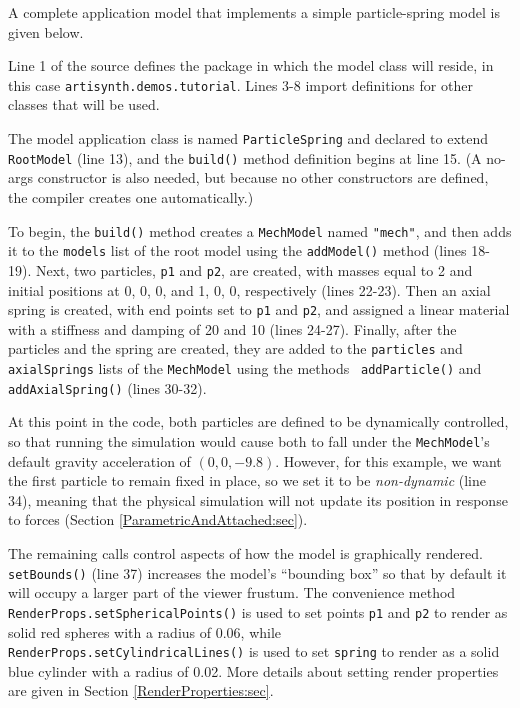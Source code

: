 A complete application model that implements a simple particle-spring
model is given below. 
\lstset{numbers=left}

\lstset{numbers=none}

Line 1 of the source defines the package in which the model class will
reside, in this case {\tt artisynth.demos.tutorial}. Lines 3-8 import
definitions for other classes that will be used.

The model application class is named {\tt ParticleSpring} and declared
to extend {\tt RootModel} (line 13), and the {\tt build()} method
definition begins at line 15. (A no-args constructor is also needed,
but because no other constructors are defined, the compiler creates
one automatically.)

To begin, the {\tt build()} method creates a {\tt MechModel} named
{\tt "mech"}, and then adds it to the {\tt models} list of the root model
using the {\tt addModel()} method (lines 18-19). Next, two particles,
{\tt p1} and {\tt p2}, are created, with masses equal to 2 and initial
positions at 0, 0, 0, and 1, 0, 0, respectively (lines 22-23). Then an
axial spring is created, with end points set to {\tt p1} and {\tt p2},
and assigned a linear material with a stiffness and damping of 20 and
10 (lines 24-27). Finally, after the particles and the spring are
created, they are added to the {\tt particles} and {\tt axialSprings}
lists of the {\tt MechModel} using the methods {\tt
addParticle()} and {\tt addAxialSpring()} (lines 30-32).

At this point in the code, both particles are defined to be
dynamically controlled, so that running the simulation would cause
both to fall under the {\tt MechModel}'s default gravity acceleration
of $(0, 0, -9.8)$. However, for this example, we want the first
particle to remain fixed in place, so we set it to be {\it
non-dynamic} (line 34), meaning that the physical simulation will not
update its position in response to forces (Section
\ref{ParametricAndAttached:sec}).

The remaining calls control aspects of how the model is graphically
rendered.  {\tt setBounds()} (line 37) increases the model's
``bounding box'' so that by default it will occupy a larger part of
the viewer frustum. The convenience method {\tt
RenderProps.setSphericalPoints()} is used to set points {\tt p1} and
{\tt p2} to render as solid red spheres with a radius of 0.06, while
{\tt RenderProps.setCylindricalLines()} is used to set {\tt spring} to
render as a solid blue cylinder with a radius of 0.02. More details
about setting render properties are given in Section
\ref{RenderProperties:sec}.

